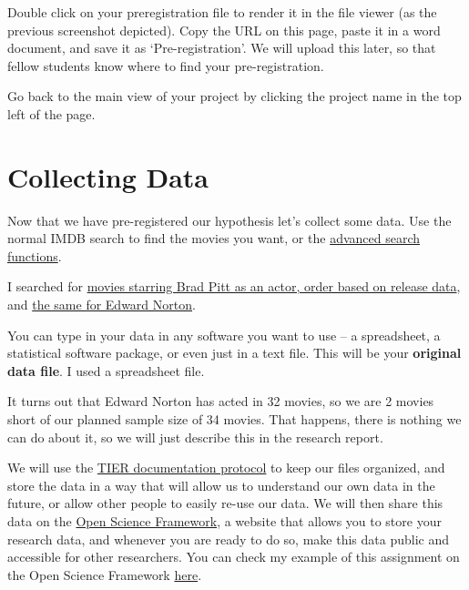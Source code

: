 \documentclass[
  oneside]{krantz}
\begin{document}
Double click on your preregistration file to render it in the file viewer (as
the previous screenshot depicted). Copy the URL on this page, paste it in a word
document, and save it as `Pre-registration'. We will upload this later, so that
fellow students know where to find your pre-registration.

Go back to the main view of your project by clicking the project name in the top
left of the page.

\hypertarget{collecting-data}{%
\section{Collecting Data}\label{collecting-data}}

Now that we have pre-registered our hypothesis let's collect some data. Use the
normal IMDB search to find the movies you want, or the \href{http://www.imdb.com/search/}{advanced search
functions}.

I searched for \href{http://www.imdb.com/filmosearch?role=nm0000093\&explore=title_type\&mode=detail\&page=1\&title_type=movie\&ref_=filmo_ref_job_typ\&sort=release_date,desc\&job_type=actor}{movies starring Brad Pitt as an actor, order based on release
data},
and \href{http://www.imdb.com/filmosearch?role=nm0001570\&explore=title_type\&mode=detail\&page=1\&title_type=movie\&ref_=filmo_ref_job_typ\&sort=release_date,desc\&job_type=actor}{the same for Edward
Norton}.

You can type in your data in any software you want to use -- a spreadsheet, a
statistical software package, or even just in a text file. This will be your
\textbf{original data file}. I used a spreadsheet file.

It turns out that Edward Norton has acted in 32 movies, so we are 2 movies short
of our planned sample size of 34 movies. That happens, there is nothing we can
do about it, so we will just describe this in the research report.

We will use the \href{https://www.projecttier.org/tier-protocol/}{TIER documentation
protocol} to keep our files
organized, and store the data in a way that will allow us to understand our own
data in the future, or allow other people to easily re-use our data. We
will then share this data on the \href{http://www.osf.io}{Open Science Framework}, a
website that allows you to store your research data, and whenever you are ready
to do so, make this data public and accessible for other researchers. You can
check my example of this assignment on the Open Science Framework
\href{https://osf.io/r4hab/}{here}.
\end{document}
